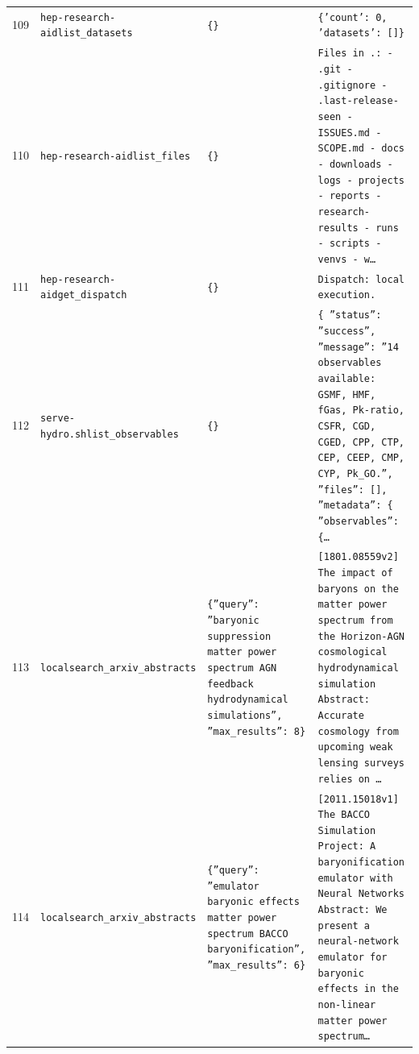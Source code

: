 \documentclass[11pt,a4paper]{article}
\begin{document}
\begin{longtable}{@{}p{}p{}p{}p{}@{}}
109 & \texttt{hep-research-aid}\newline\texttt{list\_\allowbreak{}datasets} & \texttt{\{\}\allowbreak{}} & \texttt{\{'count':\allowbreak{} 0,\allowbreak{} 'datasets':\allowbreak{} []\allowbreak{}\}\allowbreak{}} \\
110 & \texttt{hep-research-aid}\newline\texttt{list\_\allowbreak{}files} & \texttt{\{\}\allowbreak{}} & \texttt{Files in .:\allowbreak{}   - .git   - .gitignore   - .last-release-seen   - ISSUES.md   - SCOPE.md   - docs   - downloads   - logs   - projects   - reports   - research-results   - runs   - scripts   - venvs   - w\ldots{}\allowbreak{}} \\
111 & \texttt{hep-research-aid}\newline\texttt{get\_\allowbreak{}dispatch} & \texttt{\{\}\allowbreak{}} & \texttt{Dispatch:\allowbreak{} local execution.} \\
112 & \texttt{serve-hydro.sh}\newline\texttt{list\_\allowbreak{}observables} & \texttt{\{\}\allowbreak{}} & \texttt{\{   ''status'':\allowbreak{} ''success'',\allowbreak{}   ''message'':\allowbreak{} ''14 observables available:\allowbreak{} GSMF,\allowbreak{} HMF,\allowbreak{} fGas,\allowbreak{} Pk-ratio,\allowbreak{} CSFR,\allowbreak{} CGD,\allowbreak{} CGED,\allowbreak{} CPP,\allowbreak{} CTP,\allowbreak{} CEP,\allowbreak{} CEEP,\allowbreak{} CMP,\allowbreak{} CYP,\allowbreak{} Pk\_\allowbreak{}GO.'',\allowbreak{}   ''files'':\allowbreak{} []\allowbreak{},\allowbreak{}   ''metadata'':\allowbreak{} \{     ''observables'':\allowbreak{} \{\ldots{}\allowbreak{}} \\
113 & \texttt{local}\newline\texttt{search\_\allowbreak{}arxiv\_\allowbreak{}abstracts} & \texttt{\{''query'':\allowbreak{} ''baryonic suppression matter power spectrum AGN feedback hydrodynamical simulations'',\allowbreak{} ''max\_\allowbreak{}results'':\allowbreak{} 8\}\allowbreak{}} & \texttt{[1801.08559v2]\allowbreak{} The impact of baryons on the matter power spectrum from the Horizon-AGN cosmological hydrodynamical simulation Abstract:\allowbreak{} Accurate cosmology from upcoming weak lensing surveys relies on \ldots{}\allowbreak{}} \\
114 & \texttt{local}\newline\texttt{search\_\allowbreak{}arxiv\_\allowbreak{}abstracts} & \texttt{\{''query'':\allowbreak{} ''emulator baryonic effects matter power spectrum BACCO baryonification'',\allowbreak{} ''max\_\allowbreak{}results'':\allowbreak{} 6\}\allowbreak{}} & \texttt{[2011.15018v1]\allowbreak{} The BACCO Simulation Project:\allowbreak{} A baryonification emulator with Neural Networks Abstract:\allowbreak{} We present a neural-network emulator for baryonic effects in the non-linear matter power spectrum\ldots{}\allowbreak{}} \\

\end{longtable}
\end{document}
